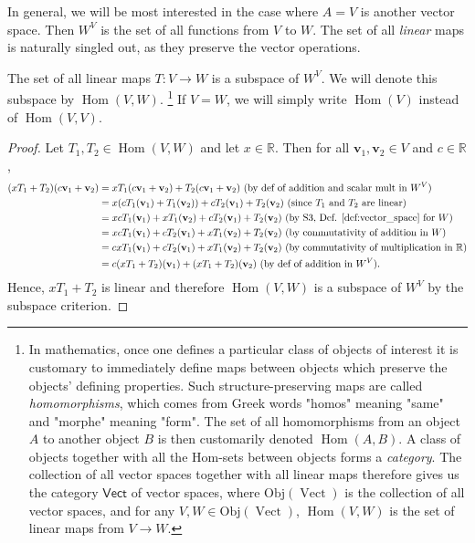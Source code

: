 \documentclass[12pt,letterpaper,reqno]{article}
\numberwithin{equation}{section}
\newcommand{\R}{\ensuremath{\mathbb R}}
\newcommand{\Obj}{\mathrm{Obj}}
\DeclareMathOperator{\Hom}{Hom}
\DeclareMathOperator{\Vect}{Vect}
\begin{document}
In general, we will be most interested in the case where $A=V$ is another vector space. Then $W^V$ is the set of all functions from $V$ to $W$. The set of all \emph{linear} maps is naturally singled out, as they preserve the vector operations.

\begin{prop}
The set of all linear maps $T:V \to W$ is a subspace of $W^V$. We will denote this subspace by $\Hom(V,W)$. \footnote{In mathematics, once one defines a particular class of objects of interest it is customary to immediately define maps between objects which preserve the objects' defining properties. Such structure-preserving maps are called \emph{homomorphisms}, which comes from Greek words "homos" meaning "same" and "morphe" meaning "form". The set of all homomorphisms from an object $A$ to another object $B$ is then customarily denoted $\Hom(A,B)$. A class of objects together with all the Hom-sets between objects forms a \emph{category}. The collection of all vector spaces together with all linear maps therefore gives us the category $\mathsf{Vect}$ of vector spaces, where $\Obj(\Vect)$ is the collection of all vector spaces, and for any $V,W \in \Obj(\Vect)$, $\Hom(V,W)$ is the set of linear maps from $V \to W$.} If $V=W$, we will simply write $\Hom(V)$ instead of $\Hom(V,V)$.	
\end{prop}

\begin{proof}
Let $T_1,T_2 \in \Hom(V,W)$ and let $x \in \R$. Then for all $\mathbf{v}_1,\mathbf{v}_2 \in V$ and $c \in \mathbb{R}$,
\begin{align*}
	(xT_1+T_2)(c\mathbf{v}_1+\mathbf{v}_2)&=xT_1 (c\mathbf{v}_1+\mathbf{v}_2)+T_2 (c\mathbf{v}_1+\mathbf{v}_2) \text{ (by def of addition and scalar mult in $W^V$) }\\
	&=x(cT_1 (\mathbf{v}_1)+T_1 (\mathbf{v}_2))+cT_2 (\mathbf{v}_1)+T_2 (\mathbf{v}_2) \text{ (since $T_1$ and $T_2$ are linear) } \\
	&=xcT_1(\mathbf{v}_1)+xT_1(\mathbf{v}_2)+cT_2(\mathbf{v}_1)+T_2(\mathbf{v}_2) \text{ (by S3, Def. \ref{def:vector_space} for $W$) }\\
	&=xcT_1(\mathbf{v}_1)+cT_2(\mathbf{v}_1)+xT_1(\mathbf{v}_2)+T_2(\mathbf{v}_2) \text{ (by commutativity of addition in $W$)} \\
	&=cxT_1(\mathbf{v}_1)+cT_2(\mathbf{v}_1)+xT_1(\mathbf{v}_2)+T_2(\mathbf{v}_2) \text{ (by commutativity of multiplication in $\R$)} \\
	&=c(xT_1+T_2)(\mathbf{v}_1)+(xT_1+T_2)(\mathbf{v}_2) \text{ (by def of addition in $W^V$)}.
\end{align*}	
Hence, $xT_1+T_2$ is linear and therefore $\Hom(V,W)$ is a subspace of $W^V$ by the subspace criterion.
\end{proof}
\end{document}
